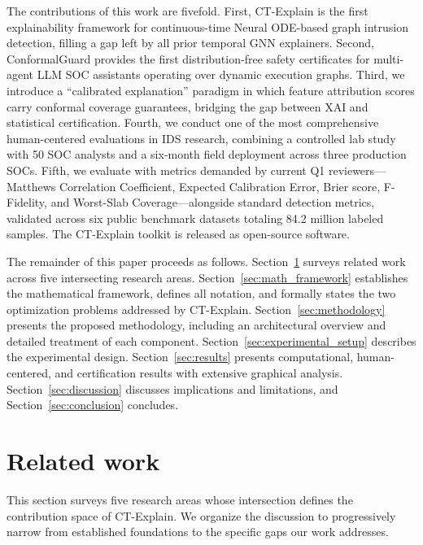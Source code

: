 \documentclass[preprint,review,12pt]{elsarticle}
\begin{document}
The contributions of this work are fivefold. First, CT-Explain is the first explainability framework for continuous-time Neural ODE-based graph intrusion detection, filling a gap left by all prior temporal GNN explainers. Second, ConformalGuard provides the first distribution-free safety certificates for multi-agent LLM SOC assistants operating over dynamic execution graphs. Third, we introduce a ``calibrated explanation'' paradigm in which feature attribution scores carry conformal coverage guarantees, bridging the gap between XAI and statistical certification. Fourth, we conduct one of the most comprehensive human-centered evaluations in IDS research, combining a controlled lab study with 50 SOC analysts and a six-month field deployment across three production SOCs. Fifth, we evaluate with metrics demanded by current Q1 reviewers---Matthews Correlation Coefficient, Expected Calibration Error, Brier score, F-Fidelity, and Worst-Slab Coverage---alongside standard detection metrics, validated across six public benchmark datasets totaling 84.2 million labeled samples. The CT-Explain toolkit is released as open-source software.

The remainder of this paper proceeds as follows. Section~\ref{sec:related_work} surveys related work across five intersecting research areas. Section~\ref{sec:math_framework} establishes the mathematical framework, defines all notation, and formally states the two optimization problems addressed by CT-Explain. Section~\ref{sec:methodology} presents the proposed methodology, including an architectural overview and detailed treatment of each component. Section~\ref{sec:experimental_setup} describes the experimental design. Section~\ref{sec:results} presents computational, human-centered, and certification results with extensive graphical analysis. Section~\ref{sec:discussion} discusses implications and limitations, and Section~\ref{sec:conclusion} concludes.


\section{Related work}
\label{sec:related_work}

This section surveys five research areas whose intersection defines the contribution space of CT-Explain. We organize the discussion to progressively narrow from established foundations to the specific gaps our work addresses.
\end{document}
